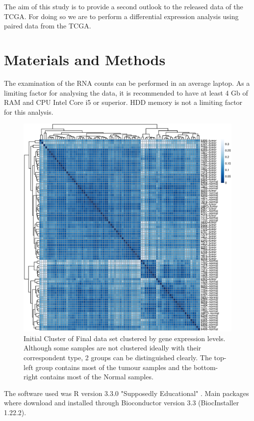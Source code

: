 \documentclass[9pt,twocolumn,twoside]{gsajnl}
\begin{document}
The aim of this study is to provide a second outlook to the released data of the TCGA. For doing so we are to perform a differential expression analysis using paired data from the TCGA.

\section*{Materials and Methods}



The examination of the RNA counts can be performed in an average laptop. As a limiting factor for analysing the data, it is recommended to have at least 4 Gb of RAM and CPU Intel Core i5 or superior. HDD memory is not a limiting factor for this analysis.

\begin{figure}[!h]
\centering
\includegraphics[width=\textwidth]{Clustering.eps}
\caption{Initial Cluster of Final data set clustered by gene expression levels. Although some samples are not clustered ideally with their correspondent type, 2 groups can be distinguished clearly. The top-left group contains most of the tumour samples and the bottom-right contains most of the Normal samples.
}
\label{fig:Clustering}
\end{figure}

The software used was R version 3.3.0 "Supposedly Educational" \cite{R}. Main packages where download and installed through Bioconductor version 3.3 (BiocInstaller 1.22.2)\cite{bioconductor}.
\end{document}
